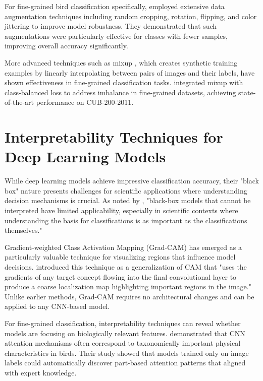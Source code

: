 For fine-grained bird classification specifically, \cite{zheng2019looking} employed extensive data augmentation techniques including random cropping, rotation, flipping, and color jittering to improve model robustness. They demonstrated that such augmentations were particularly effective for classes with fewer samples, improving overall accuracy significantly.


More advanced techniques such as mixup \cite{zhang2018mixup}, which creates synthetic training examples by linearly interpolating between pairs of images and their labels, have shown effectiveness in fine-grained classification tasks. \cite{cui2019class} integrated mixup with class-balanced loss to address imbalance in fine-grained datasets, achieving state-of-the-art performance on CUB-200-2011.


\section*{Interpretability Techniques for Deep Learning Models}

While deep learning models achieve impressive classification accuracy, their "black box" nature presents challenges for scientific applications where understanding decision mechanisms is crucial. As noted by \cite{montavon2018methods}, "black-box models that cannot be interpreted have limited applicability, especially in scientific contexts where understanding the basis for classifications is as important as the classifications themselves."


Gradient-weighted Class Activation Mapping (Grad-CAM) has emerged as a particularly valuable technique for visualizing regions that influence model decisions. \cite{selvaraju2017grad} introduced this technique as a generalization of CAM that "uses the gradients of any target concept flowing into the final convolutional layer to produce a coarse localization map highlighting important regions in the image." Unlike earlier methods, Grad-CAM requires no architectural changes and can be applied to any CNN-based model.


For fine-grained classification, interpretability techniques can reveal whether models are focusing on biologically relevant features. \cite{zhang2016picking} demonstrated that CNN attention mechanisms often correspond to taxonomically important physical characteristics in birds. Their study showed that models trained only on image labels could automatically discover part-based attention patterns that aligned with expert knowledge.



